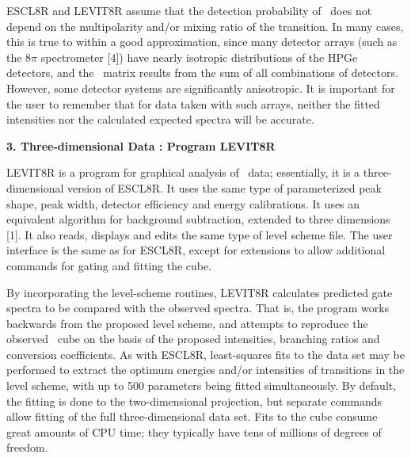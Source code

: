 ESCL8R and LEVIT8R assume that the detection probability of \grays\ does not
depend on the multipolarity and/or mixing ratio of the transition. In many
cases, this is true to within a good approximation, since many detector arrays
(such as the $8\pi$ spectrometer [4]) have nearly isotropic distributions of
the HPGe detectors, and the \ghg\ matrix results from the sum of all
combinations of detectors. However, some detector systems are significantly
anisotropic. It is important for the user to remember that for data taken with
such arrays, neither the fitted intensities nor the calculated expected spectra
will be accurate.



\begin{center}
{\bf            3. Three-dimensional Data : Program LEVIT8R}
\end{center}

LEVIT8R is a program for graphical analysis of \ghghg\ data; essentially, it is
a three-dimensional version of ESCL8R. It uses the same type of parameterized
peak shape, peak width, detector efficiency and energy calibrations. It uses an
equivalent algorithm for background subtraction, extended to three dimensions
[1]. It also reads, displays and edits the same type of level scheme file. The
user interface is the same as for ESCL8R, except for extensions to allow
additional commands for gating and fitting the cube.

By incorporating the level-scheme routines, LEVIT8R calculates predicted gate
spectra to be compared with the observed spectra. That is, the program works
backwards from the proposed level scheme, and attempts to reproduce the
observed \ghghg\ cube on the basis of the proposed intensities, branching
ratios and conversion coefficients. As with ESCL8R, least-squares fits to the
data set may be performed to extract the optimum energies and/or intensities of
transitions in the level scheme, with up to 500 parameters being fitted
simultaneously. By default, the fitting is done to the two-dimensional
projection, but separate commands allow fitting of the full three-dimensional
data set. Fits to the cube consume great amounts of CPU time; they typically
have tens of millions of degrees of freedom.


